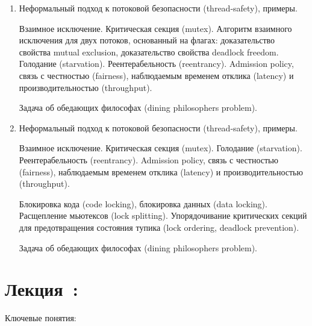 \documentclass[a4paper, 12pt]{extarticle}
\newcommand{\threadSafetySimple}{Неформальный подход к потоковой безопасности (thread-safety), примеры.}
\begin{document}
\begin{enumerate}[\thesection .1]
	
	\item \threadSafetySimple 

	Взаимное исключение. Критическая секция (mutex). Алгоритм взаимного исключения для двух потоков, основанный на флагах: доказательство свойства mutual exclusion, доказательство свойства deadlock freedom. Голодание (starvation). Реентерабельность (reentrancy). Admission policy, связь с честностью (fairness), наблюдаемым временем отклика (latency) и производительностью (throughput).
	
	Задача об обедающих философах (dining philosophers problem).

	\item \threadSafetySimple 

	Взаимное исключение. Критическая секция (mutex). Голодание (starvation). Реентерабельность (reentrancy). Admission policy, связь с честностью (fairness), наблюдаемым временем отклика (latency) и производительностью (throughput). 

	Блокировка кода (code locking), блокировка данных (data locking). Расщепление мьютексов (lock splitting). Упорядочивание критических секций для предотвращения состояния тупика (lock ordering, deadlock prevention).	
	
	Задача об обедающих философах (dining philosophers problem).

\end{enumerate}


\section{Лекция~\basicTwoNum: \basicTwoTopic}

Ключевые понятия: \basicTwoKey
\end{document}
